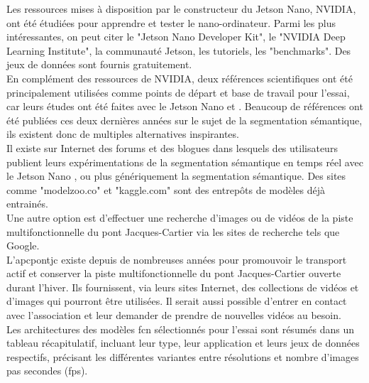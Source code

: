 ﻿\noindent Les ressources mises à disposition par le constructeur du Jetson Nano, NVIDIA, ont été étudiées pour apprendre et tester le nano-ordinateur. Parmi les plus intéressantes, on peut citer le "Jetson Nano Developer Kit", le "NVIDIA Deep Learning Institute", la communauté Jetson, les tutoriels, les "benchmarks". Des jeux de données sont fournis gratuitement.
\vspace{0.5\baselineskip}
\\
\noindent En complément des ressources de NVIDIA, deux références scientifiques ont été principalement utilisées comme points de départ et base de travail pour l'essai, car leurs études ont été faites avec le Jetson Nano \parencite{nguyen_mavnet_2019} et \parencite{zheng_real-time_2020}. Beaucoup de références ont été publiées ces deux dernières années sur le sujet de la segmentation sémantique, ils existent donc de multiples alternatives inspirantes.
\vspace{0.5\baselineskip}
\\
\noindent Il existe sur Internet des forums et des blogues dans lesquels des utilisateurs publient leurs expérimentations de la segmentation sémantique en temps réel avec le Jetson Nano \parencite{dustin_realtime_2019}, ou plus génériquement la segmentation sémantique. Des sites comme "modelzoo.co" et "kaggle.com" sont des entrepôts de modèles déjà entrainés. 
\vspace{0.5\baselineskip}
\\
\noindent Une autre option est d'effectuer une recherche d'images ou de vidéos de la piste multifonctionnelle du pont Jacques-Cartier via les sites de recherche tels que Google. 
\vspace{0.5\baselineskip}
\\
\noindent L'\acrlong{apcpontjc} existe depuis de nombreuses années pour promouvoir le transport actif et conserver la piste multifonctionnelle du pont Jacques-Cartier ouverte durant l'hiver. Ils fournissent, via leurs sites Internet, des collections de vidéos et d'images qui pourront être utilisées. Il serait aussi possible d'entrer en contact avec l'association et leur demander de prendre de nouvelles vidéos au besoin. \parencite{association_des_pietons_et_cyclistes_du_pont_jacques-cartier_pontjacques-cartier365com_2020, association_des_pietons_et_cyclistes_pont_jacques-cartier_flickr_2020}
\vspace{0.5\baselineskip}
\\
\noindent Les architectures des modèles \acrshort{fcn} sélectionnés pour l'essai sont résumés dans un tableau récapitulatif, incluant leur type, leur application et leurs jeux de données respectifs, précisant les différentes variantes entre résolutions et nombre d'images pas secondes (\acrshort{fps}).